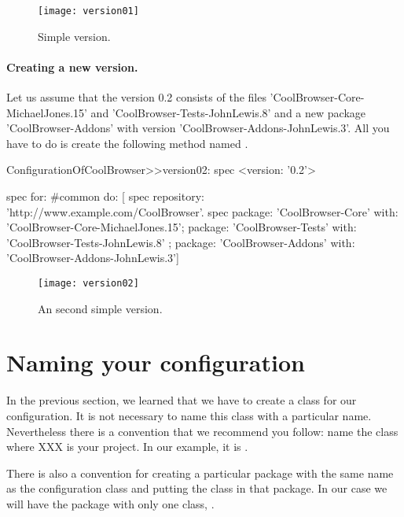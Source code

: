 \documentclass[a4paper,10pt,twoside]{book}
\begin{document}
\begin{figure}
\begin{center}
\texttt{[image: version01]}
\caption{Simple version.}
\end{center}
\end{figure}

\paragraph{Creating a new version.}
Let us assume that the version 0.2 consists of the files 'CoolBrowser-Core-MichaelJones.15' and 'CoolBrowser-Tests-JohnLewis.8' and a new package 'CoolBrowser-Addons' with version 'CoolBrowser-Addons-JohnLewis.3'. All you have to do is create the following method named .

\begin{code}{}
ConfigurationOfCoolBrowser>>version02: spec 
	<version: '0.2'>
	
	spec for: #common do: [
		spec repository: 'http://www.example.com/CoolBrowser'.
		spec 
			package: 'CoolBrowser-Core' with: 'CoolBrowser-Core-MichaelJones.15';
			package: 'CoolBrowser-Tests' with: 'CoolBrowser-Tests-JohnLewis.8' ;
			package: 'CoolBrowser-Addons' with: 'CoolBrowser-Addons-JohnLewis.3']
\end{code}
 
\begin{figure}
\begin{center}
\texttt{[image: version02]}
\caption{An second simple version.}
\end{center}
\end{figure} 
 

\section{Naming your configuration}

In the previous section, we learned that we have to create a class for our configuration. It is not necessary to name this class with a particular name. Nevertheless there is a convention that we recommend you follow: name the class  where XXX is your project. In our example, it is .

There is also a convention for creating a particular package with the same name as the configuration class and putting the class in that package. In our case we will have the package  with only one class, . 
\end{document}
